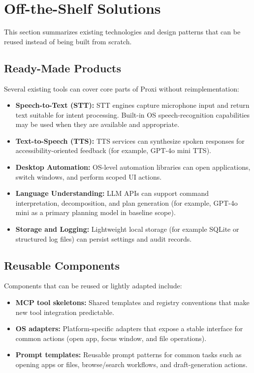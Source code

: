 \documentclass[12pt]{article}
\begin{document}
\section{Off-the-Shelf Solutions}
This section summarizes existing technologies and design patterns that
can be reused instead of being built from scratch.

\subsection{Ready-Made Products}
Several existing tools can cover core parts of Proxi without
reimplementation:
\begin{itemize}
  \item \textbf{Speech-to-Text (STT):} STT engines capture microphone
  input and return text suitable for intent processing. Built-in OS
  speech-recognition capabilities may be used when they are available
  and appropriate.
  \item \textbf{Text-to-Speech (TTS):} TTS services can synthesize
  spoken responses for accessibility-oriented feedback (for example,
  GPT-4o mini TTS).
  \item \textbf{Desktop Automation:} OS-level automation libraries can
  open applications, switch windows, and perform scoped UI actions.
  \item \textbf{Language Understanding:} LLM APIs can support command
  interpretation, decomposition, and plan generation (for example,
  GPT-4o mini as a primary planning model in baseline scope).
  \item \textbf{Storage and Logging:} Lightweight local storage (for
  example SQLite or structured log files) can persist settings and
  audit records.
\end{itemize}

\subsection{Reusable Components}
Components that can be reused or lightly adapted include:
\begin{itemize}
  \item \textbf{MCP tool skeletons:} Shared templates and registry
  conventions that make new tool integration predictable.
  \item \textbf{OS adapters:} Platform-specific adapters that expose a
  stable interface for common actions (open app, focus window, and
  file operations).
  \item \textbf{Prompt templates:} Reusable prompt patterns for common
  tasks such as opening apps or files, browse/search workflows, and
  draft-generation actions.
\end{itemize}
\end{document}
